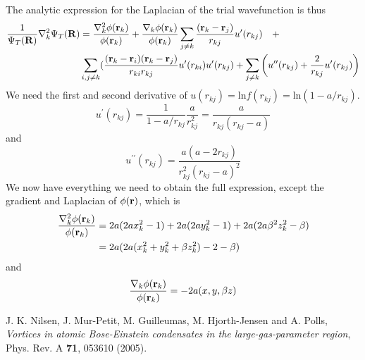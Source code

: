\documentclass[english, a4paper]{article}
\begin{document}
The analytic expression for the Laplacian of the trial wavefunction is thus
\begin{align}
 \frac{1}{\Psi_T({\bf R})}\nabla^2_k\Psi_T({\bf R}) &= 
 \frac{\nabla^2_k\phi({\bf r}_k)}{\phi({\bf r}_k)} + \frac{\nabla_k\phi({\bf r}_k)}{\phi({\bf r}_k)} 
 \sum_{j\neq k}\frac{({\bf r}_k - {\bf r}_j)}{r_{kj}} u^\prime(r_{kj}) \quad + \\
 &\sum_{i,j\neq k} (\frac{({\bf r}_k - {\bf r}_i)({\bf r}_k - {\bf r}_j)}{r_{ki}r_{kj}} u^\prime(r_{ki})u^\prime(r_{kj})
 + \sum_{j\neq k}\left( u^{\prime\prime}(r_{kj}) + \frac{2}{r_{kj}} u^\prime(r_{kj}) \right)
 \label{analytickin}
\end{align}
We need the first and second derivative of $u(r_{kj}) = \textrm{ln} f(r_{kj}) = \textrm{ln} (1-a/r_{kj})$.
\begin{equation}
 u^\prime(r_{kj}) = \frac{1}{1-a/r_{kj}} 
 \frac{a}{r^2_{kj}} = \frac{a}{r_{kj}(r_{kj} - a)}
\end{equation}
and
\begin{equation}
 u^{\prime\prime}(r_{kj}) = \frac{a(a - 2r_{kj})}{r_{kj}^2 ( r_{kj} - a)^2}
\end{equation}
We now have everything we need to obtain the full expression, except the gradient and Laplacian of
$\phi({\bf r})$, which is
\begin{align}
 \frac{\nabla^2_k\phi({\bf r}_k)}{\phi({\bf r}_k)} &= 2a(2ax_k^2 - 1) + 2a(2ay_k^2 - 1) + 2a(2a\beta^2z_k^2 - \beta) \\
 &= 2a(2a(x_k^2 + y_k^2 + \beta z_k^2) - 2 - \beta)
\end{align}
and
\begin{equation}
 \frac{\nabla_k\phi({\bf r}_k)}{\phi({\bf r}_k)}  = 
 -2a(x, y, \beta z)
\end{equation}



\begin{thebibliography}{9}

  J. K. Nilsen, J. Mur-Petit, M. Guilleumas, M. Hjorth-Jensen and A. Polls, 
  \textit{Vortices in atomic Bose-Einstein condensates in the large-gas-parameter region}, 
  Phys. Rev. A {\bf 71}, 053610 (2005).

\end{thebibliography}
\end{document}
